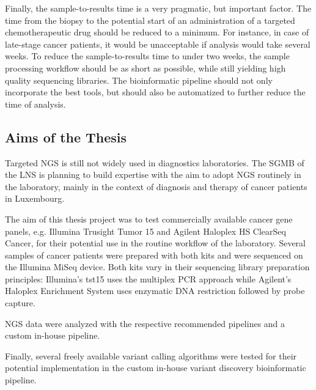 Finally, the sample-to-results time is a very pragmatic, but important factor. The time from the biopsy to the potential start of an administration of a targeted chemotherapeutic drug should be reduced to a minimum. For instance, in case of late-stage cancer patients, it would be unacceptable if analysis would take several weeks. To reduce the sample-to-results time to under two weeks, the sample processing workflow should be as short as possible, while still yielding high quality sequencing libraries. The bioinformatic pipeline should not only incorporate the best tools, but should also be automatized to further reduce the time of analysis.

\subsection{Aims of the Thesis}
Targeted NGS is still not widely used in diagnostics laboratories. The SGMB of the LNS
is planning to build expertise with the aim to adopt NGS routinely in the laboratory,
mainly in the context of diagnosis and therapy of cancer patients in Luxembourg.

The aim of this thesis project was to test commercially available cancer gene panels,
e.g. Illumina Trusight Tumor 15 and Agilent Haloplex HS ClearSeq Cancer, for their
potential use in the routine workflow of the laboratory. Several samples of cancer
patients were prepared with both kits and were sequenced on the Illumina MiSeq device.
Both kits vary in their sequencing library preparation principles: Illumina's tst15
uses the multiplex PCR approach while Agilent's Haloplex Enrichment System uses
enzymatic DNA restriction followed by probe capture.

NGS data were analyzed with the respective recommended pipelines and a custom in-house
pipeline.

Finally, several freely available variant calling algorithms were tested for their
potential implementation in the custom in-house variant discovery bioinformatic
pipeline.
